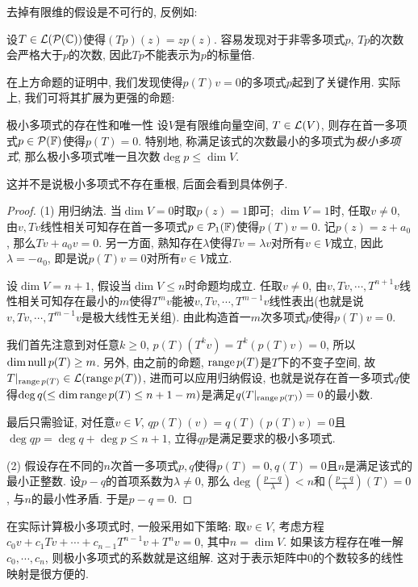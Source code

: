 去掉有限维的假设是不可行的, 反例如: 

\begin{example}
	设$T \in \mathcal{L} (\mathcal{P}(\mathbb{C}))$使得$(Tp)(z)=zp(z)$. 容易发现对于非零多项式$p$, $Tp$的次数会严格大于$p$的次数, 因此$Tp$不能表示为$p$的标量倍. 
\end{example}

在上方命题的证明中, 我们发现使得$p(T)v=0$的多项式$p$起到了关键作用. 实际上, 我们可将其扩展为更强的命题: 

\begin{proposition}{极小多项式的存在性和唯一性}
	设$V$是有限维向量空间, $T \in \mathcal{L} (V)$, 则存在首一多项式$p \in \mathcal{P}(\mathbb{F})$使得$p(T)=0$. 特别地, 称满足该式的次数最小的多项式为\textit{极小多项式}, 那么极小多项式唯一且次数$\deg p \leq \dim V$. 
\end{proposition}
\begin{remark}
	这并不是说极小多项式不存在重根, 后面会看到具体例子. 
\end{remark}
\begin{proof}
	(1) 用归纳法. 当$\dim V=0$时取$p(z)=1$即可; $\dim V=1$时, 任取$v \neq 0$, 由$v,Tv$线性相关可知存在首一多项式$p \in \mathcal{P}_1(\mathbb{F})$使得$p(T)v=0$. 记$p(z)=z+a_0$, 那么$Tv+a_0 v=0$. 另一方面, 熟知存在$\lambda$使得$Tv=\lambda v$对所有$v \in V$成立, 因此$\lambda = -a_0$, 即是说$p(T)v=0$对所有$v \in V$成立. 
	
	设$\dim V=n+1$, 假设当$\dim V \leq n$时命题均成立. 任取$v \neq 0$, 由$v,Tv,\cdots ,T^{n+1}v$线性相关可知存在最小的$m$使得$T^mv$能被$v,Tv,\cdots ,T^{m-1}v$线性表出(也就是说$v,Tv,\cdots ,T^{m-1}v$是极大线性无关组). 由此构造首一$m$次多项式$p$使得$p(T)v=0$. 
	
	我们首先注意到对任意$k \geq 0$, $p(T)(T^kv) = T^k(p(T)v)=0$, 所以$\dim \operatorname{null} p(T) \geq m$. 另外, 由之前的命题, $\operatorname{range} p(T)$是$T$下的不变子空间, 故$T|_{\operatorname{range} p(T)} \in \mathcal{L} (\operatorname{range} p(T))$, 进而可以应用归纳假设, 也就是说存在首一多项式$q$使得$\deg q (\leq \dim \operatorname{range} p(T) \leq n+1-m)$是满足$q(T|_{\operatorname{range} p(T)}) = 0$的最小数. 
	
	最后只需验证, 对任意$v \in V$, $qp(T)(v) = q(T)(p(T)v) = 0$且$\deg qp = \deg q + \deg p \leq n+1$, 立得$qp$是满足要求的极小多项式. 
	
	(2) 假设存在不同的$n$次首一多项式$p,q$使得$p(T)=0,q(T)=0$且$n$是满足该式的最小正整数. 设$p-q$的首项系数为$\lambda \neq 0$, 那么$\deg (\frac{p-q}{\lambda})<n$和$(\frac{p-q}{\lambda})(T)=0$, 与$n$的最小性矛盾. 于是$p-q=0$. 
\end{proof}

在实际计算极小多项式时, 一般采用如下策略: 取$v \in V$, 考虑方程$c_0v + c_1Tv + \cdots + c_{n-1}T^{n-1}v + T^nv = 0$, 其中$n=\dim V$. 如果该方程存在唯一解$c_0,\cdots ,c_n$, 则极小多项式的系数就是这组解. 这对于表示矩阵中$0$的个数较多的线性映射是很方便的. 

